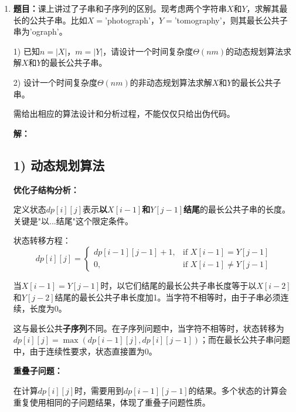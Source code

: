 \documentclass[UTF8,12pt,a4paper]{ctexart}
\begin{document}
\begin{enumerate}[1.]
	\textbf{时间复杂度分析：}

	算法需要填充一个$n \times \text{sum}/2$的动态规划表。每个状态的计算时间为$O(1)$。因此，总时间复杂度为$O(n \cdot \text{sum}/2)$。

	\textbf{空间复杂度分析：}

	需要维护一个维度为$n \times \text{sum}/2$的动态规划表，因此空间复杂度为$O(n \cdot \text{sum}/2)$。

	\newpage

	\item \textbf{题目：}课上讲过了子串和子序列的区别。现考虑两个字符串$X$和$Y$，求解其最长的公共子串。比如$X=$'photograph'，$Y=$'tomography'，则其最长公共子串为'ograph'。
	
	1) 已知$n=|X|$，$m=|Y|$，请设计一个时间复杂度$\Theta(nm)$的动态规划算法求解$X$和$Y$的最长公共子串。

	2) 设计一个时间复杂度$\Theta(nm)$的非动态规划算法求解$X$和$Y$的最长公共子串。

	需给出相应的算法设计和分析过程，不能仅仅只给出伪代码。

	\textbf{解：}

	\subsection*{1) 动态规划算法}

	\textbf{优化子结构分析：}

	定义状态$dp[i][j]$表示\textbf{以$X[i-1]$和$Y[j-1]$结尾}的最长公共子串的长度。关键是"以...结尾"这个限定条件。

	状态转移方程：
	$$dp[i][j] = \begin{cases}
		dp[i-1][j-1] + 1, & \text{if } X[i-1] = Y[j-1] \\
		0, & \text{if } X[i-1] \neq Y[j-1]
	\end{cases}$$

	当$X[i-1] = Y[j-1]$时，以它们结尾的最长公共子串长度等于以$X[i-2]$和$Y[j-2]$结尾的最长公共子串长度加1。当字符不相等时，由于子串必须连续，长度为0。

	这与最长公共\textbf{子序列}不同。在子序列问题中，当字符不相等时，状态转移为$dp[i][j] = \max(dp[i-1][j], dp[i][j-1])$；而在最长公共子串问题中，由于连续性要求，状态直接置为0。

	\textbf{重叠子问题：}

	在计算$dp[i][j]$时，需要用到$dp[i-1][j-1]$的结果。多个状态的计算会重复使用相同的子问题结果，体现了重叠子问题性质。


\end{enumerate}
\end{document}
